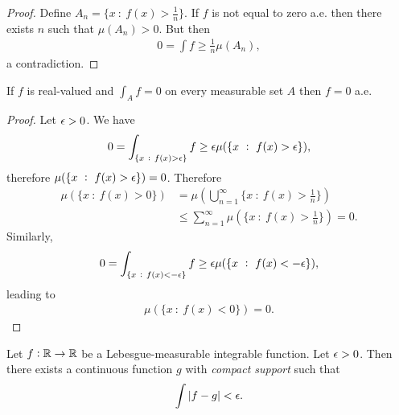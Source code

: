 \begin{proof}
  Define $A_n = \{x ~:~ f(x) > \frac{1}{n}\}$. If $f$ is not equal to zero a.e. then there exists $n$ such
  that $\mu(A_n) > 0$. But then
  \begin{align*}
    0 = \int f \geq \frac{1}{n} \mu(A_n),
  \end{align*}
  a contradiction.
\end{proof}


\begin{theorem}
  If $f$ is real-valued and $\int_A f = 0$ on every measurable set $A$ then $f = 0$ a.e.
\end{theorem}

\begin{proof}
  Let $\epsilon > 0$. We have
  \begin{align*}
    0 = \int_{\{x ~:~ f(x) > \epsilon\}} f \geq \epsilon\mu(\{x ~:~ f(x) > \epsilon\}),
  \end{align*}
  therefore $\mu(\{x ~:~ f(x) > \epsilon\}) = 0$. Therefore
  \begin{align*}
    \mu(\{x ~:~ f(x) > 0\})
    &= \mu(\bigcup_{n=1}^\infty \{x ~:~ f(x) > \frac{1}{n}\}) \\
    &\leq \sum_{n=1}^\infty \mu(\{x ~:~ f(x) > \frac{1}{n}\}) = 0.
  \end{align*}
  Similarly,
  \begin{align*}
    0 = \int_{\{x ~:~ f(x) < -\epsilon\}} f \geq \epsilon\mu(\{x ~:~ f(x) < -\epsilon\}),
  \end{align*}
  leading to
  \begin{align*}
    \mu(\{x ~:~ f(x) < 0\}) = 0.
  \end{align*}
\end{proof}



\begin{theorem}
  Let $f: \mathbb{R}\to \mathbb{R}$ be a Lebesgue-measurable integrable function. Let $\epsilon > 0$. Then there exists a
  continuous function $g$ with {\it compact support} such that
  \begin{align*}
    \int |f - g| < \epsilon.
  \end{align*}
\end{theorem}



\begin{theorem}

\end{theorem}

